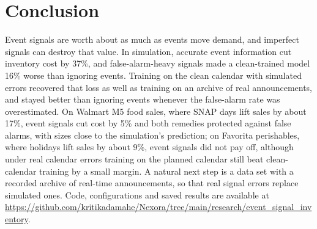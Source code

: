 \section{Conclusion}
\label{sec:conclusion}
Event signals are worth about as much as events move demand, and imperfect signals can destroy that value. In simulation, accurate event information cut inventory cost by 37\%, and false-alarm-heavy signals made a clean-trained model 16\% worse than ignoring events. Training on the clean calendar with simulated errors recovered that loss as well as training on an archive of real announcements, and stayed better than ignoring events whenever the false-alarm rate was overestimated. On Walmart M5 food sales, where SNAP days lift sales by about 17\%, event signals cut cost by 5\% and both remedies protected against false alarms, with sizes close to the simulation's prediction; on Favorita perishables, where holidays lift sales by about 9\%, event signals did not pay off, although under real calendar errors training on the planned calendar still beat clean-calendar training by a small margin. A natural next step is a data set with a recorded archive of real-time announcements, so that real signal errors replace simulated ones. Code, configurations and saved results are available at \url{https://github.com/kritikadamahe/Nexora/tree/main/research/event_signal_inventory}.





